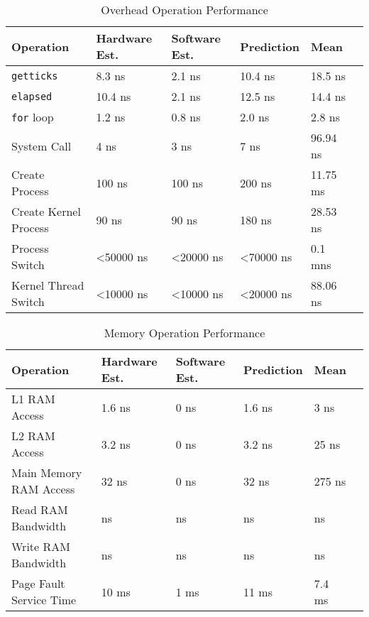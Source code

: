 \documentclass{article} %
\begin{document}
\begin{table}[!htbp]
  \caption{Overhead Operation Performance}
  \begin{tabular}{|l|l|l|l|l|l|}
    \hline
    Operation              & Hardware Est.         & Software Est.         & Prediction            & Mean     \\ \hline
    \texttt{getticks}      & 8.3 ns                & 2.1 ns                & 10.4 ns               & 18.5 ns\\ \hline
    \texttt{elapsed}       & 10.4 ns               & 2.1 ns                & 12.5 ns               & 14.4 ns\\ \hline
    \texttt{for} loop      & 1.2 ns                & 0.8 ns                & 2.0 ns                & 2.8 ns\\ \hline
    System Call            & 4 ns                  & 3 ns                  & 7 ns                  & 96.94 ns\\ \hline
    Create Process         & 100 ns                & 100 ns                & 200 ns                & 11.75 ms\\ \hline
    Create Kernel Process  & 90 ns                 & 90 ns                 & 180 ns                & 28.53 ns\\ \hline
    Process Switch         & \textless50000 ns     & \textless20000 ns     & \textless70000 ns     & 0.1 mns\\ \hline
    Kernel Thread Switch   & \textless10000 ns     & \textless10000 ns     & \textless20000 ns     & 88.06 ns\\ \hline
  \end{tabular}
  \label{table:overview_overhead}
\end{table}

\begin{table}[!htbp]
  \caption{Memory Operation Performance}
  \begin{tabular}{|l|l|l|l|l|l|}
    \hline
    Operation               & Hardware Est.         & Software Est.         & Prediction            & Mean     \\ \hline
    L1 RAM Access           & 1.6 ns                & 0 ns                  & 1.6 ns                & 3 ns\\ \hline
    L2 RAM Access           & 3.2 ns                & 0 ns                  & 3.2 ns                & 25 ns\\ \hline
    Main Memory RAM Access  & 32 ns                 & 0 ns                  & 32 ns                 & 275 ns\\ \hline
    Read RAM Bandwidth      & ns                    & ns                    & ns                    & ns\\ \hline
    Write RAM Bandwidth     & ns                    & ns                    & ns                    & ns\\ \hline
    Page Fault Service Time & 10 ms                 & 1 ms                  & 11 ms                 & 7.4 ms\\ \hline
  \end{tabular}
  \label{table:overview_memory}
\end{table}
\end{document}
